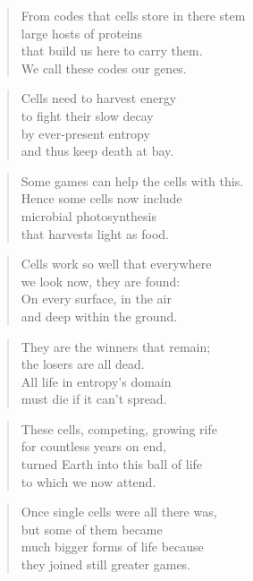 \documentclass[10pt,a4paper]{article}
\begin{document}
\begin{paracol}{2}
\begin{verse}
From codes that cells store in there stem\\
large hosts of proteins\\
that build us here to carry them.\\
We call these codes our genes.
\end{verse}

\begin{verse}
Cells need to harvest energy\\
to fight their slow decay\\
by ever-present entropy\\
and thus keep death at bay.
\end{verse}

\begin{verse}
Some games can help the cells with this.\\
Hence some cells now include\\
microbial photosynthesis\\
that harvests light as food.
\end{verse}

\begin{verse}
Cells work so well that everywhere\\
we look now, they are found:\\
On every surface, in the air\\
and deep within the ground.
\end{verse}

\begin{verse}
They are the winners that remain;\\
the losers are all dead.\\
All life in entropy’s domain\\
must die if it can’t spread.
\end{verse}

\begin{verse}
These cells, competing, growing rife\\
for countless years on end,\\
turned Earth into this ball of life\\
to which we now attend.
\end{verse}

\begin{verse}
Once single cells were all there was,\\
but some of them became\\
much bigger forms of life because\\
they joined still greater games.
\end{verse}


\end{paracol}
\end{document}
